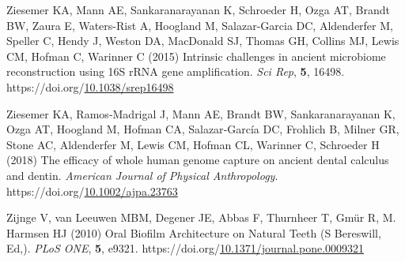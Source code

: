 \documentclass[
  11pt,
  leqno]{scrartcl}
\newlength{\cslhangindent}
\newenvironment{CSLReferences}[2] %
 {\begin{list}{}{%
  \setlength{\itemindent}{0pt}
  \setlength{\leftmargin}{0pt}
  \setlength{\parsep}{0pt}
  \ifodd #1
   \setlength{\leftmargin}{\cslhangindent}
   \setlength{\itemindent}{-1\cslhangindent}
  \fi
  \setlength{\itemsep}{#2\baselineskip}}}
 {\end{list}}
\begin{document}
\begin{CSLReferences}{1}{0}
Ziesemer KA, Mann AE, Sankaranarayanan K, Schroeder H, Ozga AT, Brandt
BW, Zaura E, Waters-Rist A, Hoogland M, Salazar-Garcia DC, Aldenderfer
M, Speller C, Hendy J, Weston DA, MacDonald SJ, Thomas GH, Collins MJ,
Lewis CM, Hofman C, Warinner C (2015) Intrinsic challenges in ancient
microbiome reconstruction using {16S rRNA} gene amplification. \emph{Sci
Rep}, \textbf{5}, 16498.
https://doi.org/\href{https://doi.org/10.1038/srep16498}{10.1038/srep16498}

Ziesemer KA, Ramos‐Madrigal J, Mann AE, Brandt BW, Sankaranarayanan K,
Ozga AT, Hoogland M, Hofman CA, Salazar‐García DC, Frohlich B, Milner
GR, Stone AC, Aldenderfer M, Lewis CM, Hofman CL, Warinner C, Schroeder
H (2018) The efficacy of whole human genome capture on ancient dental
calculus and dentin. \emph{American Journal of Physical Anthropology}.
https://doi.org/\href{https://doi.org/10.1002/ajpa.23763}{10.1002/ajpa.23763}

Zijnge V, van Leeuwen MBM, Degener JE, Abbas F, Thurnheer T, Gmür R, M.
Harmsen HJ (2010) Oral {Biofilm Architecture} on {Natural Teeth} (S
Bereswill, Ed,). \emph{PLoS ONE}, \textbf{5}, e9321.
https://doi.org/\href{https://doi.org/10.1371/journal.pone.0009321}{10.1371/journal.pone.0009321}

\end{CSLReferences}
\end{document}
